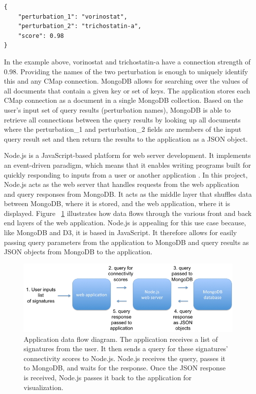 \documentclass[12pt]{article}
\begin{document}
\begin{lstlisting}
{
	"perturbation_1": "vorinostat",
	"perturbation_2": "trichostatin-a",
	"score": 0.98
}
\end{lstlisting}
	
In the example above, vorinostat and trichostatin-a have a connection strength of 0.98. Providing the names of the two perturbation is enough to uniquely identify this and any CMap connection. MongoDB allows for searching over the values of all documents that contain a given key or set of keys. The application stores each CMap connection as a document in a single MongoDB collection. Based on the user's input set of query results (perturbation names), MongoDB is able to retrieve all connections between the query results by looking up all documents where the perturbation\_1 and perturbation\_2 fields are members of the input query result set and then return the results to the application as a JSON object.

Node.js is a JavaScript-based platform for web server development. It implements an event-driven paradigm, which means that it enables writing programs built for quickly responding to inputs from a user or another application \cite{node}. In this project, Node.js acts as the web server that handles requests from the web application and query responses from MongoDB. It acts as the middle layer that shuffles data between MongoDB, where it is stored, and the web application, where it is displayed. Figure ~\ref{fig:app_data_flow} illustrates how data flows through the various front and back end layers of the web application. Node.js is appealing for this use case because, like MongoDB and D3, it is based in JavaScript. It therefore allows for easily passing query parameters from the application to MongoDB and query results as JSON objects from MongoDB to the application.

\begin{figure}[h]
\centering
\includegraphics[scale=0.5]{img/app_data_flow_small.png}
\caption{ Application data flow diagram. The application receives a list of signatures from the user. It then sends a query for these signatures' connectivity scores to Node.js. Node.js receives the query, passes it to MongoDB, and waits for the response. Once the JSON response is received, Node.js passes it back to the application for visualization.}
\label{fig:app_data_flow}
\end{figure}
\end{document}
